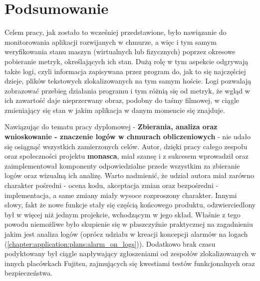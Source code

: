 \chapter[Podsumowanie]{Podsumowanie}
\label{chapter:summary}

Celem pracy, jak zostało to wcześniej przedstawione, było nawiązanie do monitorowania aplikacji
rozwijanych w chmurze, a więc i tym samym weryfikowania stanu maszyn (wirtualnych lub fizycznych) poprzez
okresowe pobieranie metryk, określających ich stan. Dużą rolę w tym aspekcie odgrywają także logi, czyli
informacja zapisywana przez program do, jak to się najczęściej dzieje, plików tekstowych zlokalizowanych
na tym samym hoście. Logi pozwalają zobrazować przebieg działania programu i tym różnią się od metryk, że
wgląd w ich zawartość daje nieprzerwany obraz, podobny do taśmy filmowej, w ciągle zmieniający się stan w jakim
aplikacja w danym momencie się znajduje. 

Nawiązując do tematu pracy dyplomowej - \textbf{Zbierania, analiza oraz wnioskowanie - znaczenie logów w chmurach
    obliczeniowych} - nie udało się osiągnąć wszystkich zamierzonych celów. Autor, dzięki pracy całego zespołu oraz
społeczności projektu \textbf{monasca}, miał szansę i z sukcesem wprowadził oraz zaimplementował komponenty
odpowiedzialne przede wszystkim za zbieranie logów oraz wizualną ich analizę. Warto nadmienić, że udział autora
miał zarówno charakter pośredni - ocena kodu, akceptacja zmian oraz bezpośredni - implementacja, a same zmiany
miały wysoce rozproszony charakter. Innymi słowy, fakt że nowe funkcje stały się częścią końcowego produktu, 
odzwierciedlony był w więcej niż jednym projekcie, wchodzącym w jego skład. Właśnie z tego powodu niemożliwe było
skupienie się w płaszczyźnie praktycznej na zagadnieniu jakim jest analiza logów (oprócz udziału w kreacji
koncepcji alarmów na logach 
(\ref{chapter:application:plans:alarm_on_logs})). Dodatkowo brak czasu podyktowany był ciągle
napływający zgłoszeniami od zespołów zlokalizowanych w innych placówkach Fujitsu, zajmujących się kwestiami testów
funkcjonalnych oraz bezpieczeństwa.


